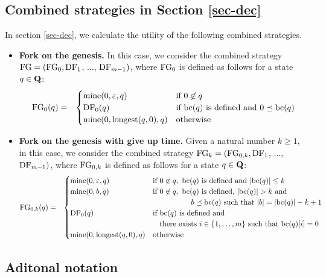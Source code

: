 \subsection{Combined strategies in Section \ref{sec-dec}}
In section \ref{sec-dec}, we calculate the utility of the following combined strategies.
\begin{itemize}
\item {\bf Fork on the genesis.} In this case, we consider the combined strategy $\text{\rm FG} = (\text{\rm FG}_0, \text{\rm DF}_1$, $\ldots$, $\text{\rm DF}_{m-1})$, where $\text{\rm FG}_0$ is defined as follows for a state $q \in \mathbf{Q}$:
\begin{eqnarray*}
\text{\rm FG}_0(q) & = &
\begin{cases}
\text{\rm mine}(0,\varepsilon,q) & \text{if } 0 \not\in q\\
\text{\rm DF}_0(q) & \text{if } \text{bc}(q) \text{ is defined and } 0 \preceq \text{bc}(q)\\
\text{\rm mine}(0,{\text{\rm longest}}(q,0),q) &  \text{otherwise}
\end{cases}
\end{eqnarray*}

\item {\bf Fork on the genesis with give up time.} Given a natural number $k \geq 1$, in this case, we consider the combined strategy $\text{\rm FG}_k = (\text{\rm FG}_{0,k}, \text{\rm DF}_1$, $\ldots$, $\text{\rm DF}_{m-1})$, where $\text{\rm FG}_{0,k}$ is defined as follows for a state $q \in \mathbf{Q}$:
\begin{eqnarray*}
\text{\rm FG}_{0,k}(q) & = &
\begin{cases}
\text{\rm mine}(0,\varepsilon,q) & \text{if } 0 \not\in q,\ \text{bc}(q) \text{ is defined and } |\text{bc}(q)| \leq k\\
\text{\rm mine}(0,b,q) & \text{if } 0 \not\in q,\ \text{bc}(q) \text{ is defined, } |\text{bc}(q)| > k \text{ and }\\
& \hspace{51pt} b \preceq \text{bc}(q) \text{ such that } |b| = |\text{bc}(q)|-k+1\\
\text{\rm DF}_0(q) & \text{if } \text{bc}(q) \text{ is defined and}\\
& \hspace{9pt} \text{there exists } i \in \{1, \ldots, m\} \text{ such that } \text{bc}(q)[i] = 0\\
\text{\rm mine}(0,{\text{\rm longest}}(q,0),q) &  \text{otherwise}
\end{cases}
\end{eqnarray*}

\end{itemize}

\subsection{Aditonal notation}




